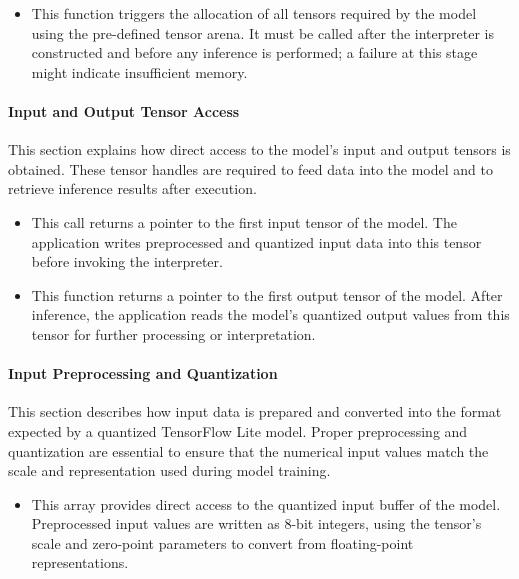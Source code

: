 \begin{itemize}
	\item {} 
	
	This function triggers the allocation of all tensors required by the model using the pre-defined tensor arena. It must be called after the interpreter is constructed and before any inference is performed; a failure at this stage might indicate insufficient memory.
\end{itemize}


\paragraph{Input and Output Tensor Access}

This section explains how direct access to the model’s input and output tensors is obtained. These tensor handles are required to feed data into the model and to retrieve inference results after execution.

\begin{itemize}
	\item {} 
	
	This call returns a pointer to the first input tensor of the model. The application writes preprocessed and quantized input data into this tensor before invoking the interpreter.
	
	\item {} 
	
	This function returns a pointer to the first output tensor of the model. After inference, the application reads the model’s quantized output values from this tensor for further processing or interpretation.
\end{itemize}

\paragraph{Input Preprocessing and Quantization}

This section describes how input data is prepared and converted into the format expected by a quantized TensorFlow Lite model. Proper preprocessing and quantization are essential to ensure that the numerical input values match the scale and representation used during model training.

\begin{itemize}
	\item {} 
	
	This array provides direct access to the quantized input buffer of the model. Preprocessed input values are written as 8-bit integers, using the tensor’s scale and zero-point parameters to convert from floating-point representations.
\end{itemize}


